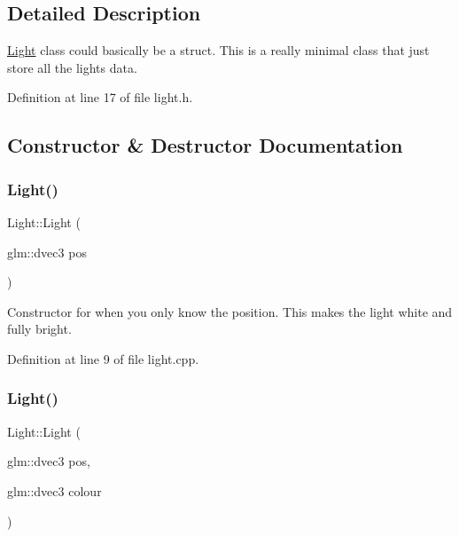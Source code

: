 \subsection{Detailed Description}
\mbox{\hyperlink{class_light}{Light}} class could basically be a struct. This is a really minimal class that just store all the light\textquotesingle{}s data. 

Definition at line 17 of file light.\+h.



\subsection{Constructor \& Destructor Documentation}
\mbox{\label{class_light_a6f416160e79aad1966bd19bc8fa2852c}} 
\subsubsection{\texorpdfstring{Light()}{Light()}\hspace{0.1cm}{\footnotesize\ttfamily [1/2]}}
{\footnotesize\ttfamily Light\+::\+Light (\begin{DoxyParamCaption}\item[{glm\+::dvec3}]{pos }\end{DoxyParamCaption})}



Constructor for when you only know the position. This makes the light white and fully bright. 



Definition at line 9 of file light.\+cpp.

\mbox{\label{class_light_a2f01af29bdae678683ee60a5ce5997ac}} 
\subsubsection{\texorpdfstring{Light()}{Light()}\hspace{0.1cm}{\footnotesize\ttfamily [2/2]}}
{\footnotesize\ttfamily Light\+::\+Light (\begin{DoxyParamCaption}\item[{glm\+::dvec3}]{pos,  }\item[{glm\+::dvec3}]{colour }\end{DoxyParamCaption})}



